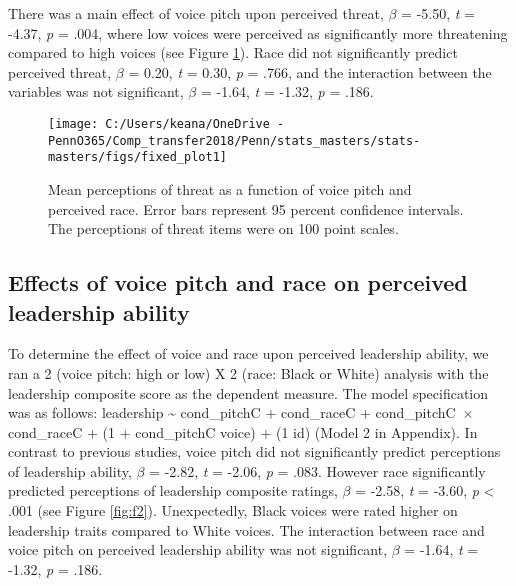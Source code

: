 \documentclass[
  english,
  man, noextraspace,floatsintext]{apa6}
\begin{document}
There was a main effect of voice pitch upon perceived threat, \(\beta\) = -5.50, \emph{t} = -4.37, \emph{p} = .004, where low voices were perceived as significantly more threatening compared to high voices (see Figure \ref{fig:f1}). Race did not significantly predict perceived threat, \(\beta\) = 0.20, \emph{t} = 0.30, \emph{p} = .766, and the interaction between the variables was not significant, \(\beta\) = -1.64, \emph{t} = -1.32, \emph{p} = .186.

\begin{figure}

{\centering \texttt{[image: C:/Users/keana/OneDrive - PennO365/Comp\_transfer2018/Penn/stats\_masters/stats-masters/figs/fixed\_plot1]} 

}

\caption{Mean perceptions of threat as a function of voice pitch and perceived race. Error bars represent 95 percent confidence intervals. The perceptions of threat items were on 100 point scales.}\label{fig:f1}
\end{figure}

\hypertarget{effects-of-voice-pitch-and-race-on-perceived-leadership-ability}{%
\subsection{Effects of voice pitch and race on perceived leadership ability}\label{effects-of-voice-pitch-and-race-on-perceived-leadership-ability}}

To determine the effect of voice and race upon perceived leadership ability, we ran a 2 (voice pitch: high or low) X 2 (race: Black or White) analysis with the leadership composite score as the dependent measure. The model specification was as follows: leadership \textasciitilde{} cond\_pitchC + cond\_raceC + cond\_pitchC~\(\times\) cond\_raceC + (1 + cond\_pitchC \textbar{} voice) + (1 \textbar{} id) (Model 2 in Appendix). In contrast to previous studies, voice pitch did not significantly predict perceptions of leadership ability, \(\beta\) = -2.82, \emph{t} = -2.06, \emph{p} = .083. However race significantly predicted perceptions of leadership composite ratings, \(\beta\) = -2.58, \emph{t} = -3.60, \emph{p} \textless{} .001 (see Figure \ref{fig:f2}). Unexpectedly, Black voices were rated higher on leadership traits compared to White voices. The interaction between race and voice pitch on perceived leadership ability was not significant, \(\beta\) = -1.64, \emph{t} = -1.32, \emph{p} = .186.
\end{document}
